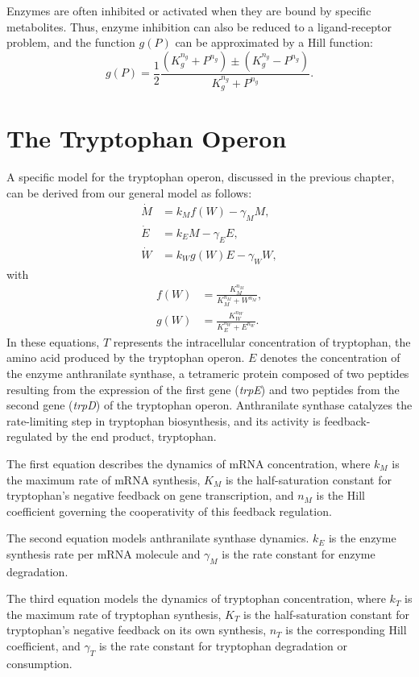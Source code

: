 Enzymes are often inhibited or activated when they are bound by specific metabolites. Thus, enzyme inhibition can also be reduced to a ligand-receptor problem, and the function $g(P)$ can be approximated by a Hill function:
\begin{equation*}
g(P)=\frac{1}{2} \frac{(K_g^{n_g}+P^{n_g})\pm(K_g^{n_g}-P^{n_g})}{K_g^{n_g}+P^{n_g}}.
\end{equation*}

\section{The Tryptophan Operon}

A specific model for the tryptophan operon, discussed in the previous chapter, can be derived from our general model as follows:
\begin{align}
\dot{M} &= k_M f(W) - \gamma_M M, \label{eq:27.04}\\
\dot{E} &= k_E M - \gamma_E E,\label{eq:27.05}\\
\dot{W} &= k_W g(W) E - \gamma_W W, \label{eq:27.06}
\end{align}
with
\begin{align*}
f(W)&=\frac{K_M^{n_M}}{K_M^{n_M}+W^{n_M}},\\
g(W)&=\frac{K_W^{n_W}}{K_E^{n_W}+E^{n_W}}.
\end{align*}
In these equations, $T$ represents the intracellular concentration of tryptophan, the amino acid produced by the tryptophan operon. $E$ denotes the concentration of the enzyme anthranilate synthase, a tetrameric protein composed of two peptides resulting from the expression of the first gene (\emph{trpE}) and two peptides from the second gene (\emph{trpD}) of the tryptophan operon. Anthranilate synthase catalyzes the rate-limiting step in tryptophan biosynthesis, and its activity is feedback-regulated by the end product, tryptophan.

The first equation describes the dynamics of mRNA concentration, where $k_M$ is the maximum rate of mRNA synthesis, $K_M$ is the half-saturation constant for tryptophan's negative feedback on gene transcription, and $n_M$ is the Hill coefficient governing the cooperativity of this feedback regulation.

The second equation models anthranilate synthase dynamics. $k_E$ is the enzyme synthesis rate per mRNA molecule and $\gamma_M$ is the rate constant for enzyme degradation. 

The third equation models the dynamics of tryptophan concentration, where $k_T$ is the maximum rate of tryptophan synthesis, $K_T$ is the half-saturation constant for tryptophan's negative feedback on its own synthesis, $n_T$ is the corresponding Hill coefficient, and $\gamma_T$ is the rate constant for tryptophan degradation or consumption.

